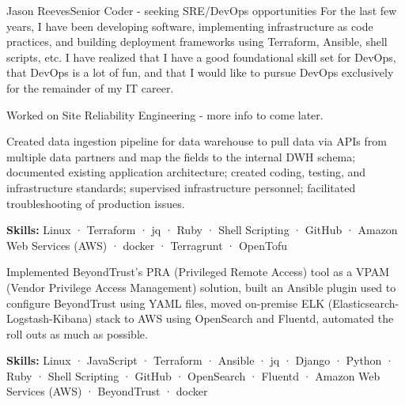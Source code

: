 \documentclass{article}
\begin{document}
\begin{cv}[avatar]{Jason Reeves}{Senior Coder - seeking SRE/DevOps opportunities}
For the last few years, I have been developing software, implementing infrastructure as code practices, and building deployment frameworks using Terraform, Ansible, shell scripts, etc.  I have realized that I have a good foundational skill set for DevOps, that DevOps is a lot of fun, and that I would like to pursue DevOps exclusively for the remainder of my IT career.

\begin{cvevent}[June 2024][present]
    Worked on Site Reliability Engineering - more info to come later.
    \vspace*{5mm}
\end{cvevent}

\begin{cvevent}[December 2023][June 2024]
    Created data ingestion pipeline for data warehouse to pull data via APIs from multiple data partners and map the fields to the internal DWH schema; documented existing application architecture; created coding, testing, and infrastructure standards; supervised infrastructure personnel; facilitated troubleshooting of production issues.

    \vspace*{3mm}
    \textbf{Skills:}  Linux · Terraform · jq · Ruby · Shell Scripting · GitHub · Amazon Web Services (AWS) · docker · Terragrunt · OpenTofu
    
    \vspace*{5mm}
\end{cvevent}

\begin{cvevent}[August 2021][December 2023]
    Implemented BeyondTrust's PRA (Privileged Remote Access) tool as a VPAM (Vendor Privilege Access Management) solution, built an Ansible plugin used to configure BeyondTrust using YAML files, moved on-premise ELK (Elasticsearch-Logstash-Kibana) stack to AWS using OpenSearch and Fluentd, automated the roll outs as much as possible.

    \vspace*{3mm}
    \textbf{Skills:}  Linux · JavaScript · Terraform · Ansible · jq · Django · Python · Ruby · Shell Scripting · GitHub · OpenSearch · Fluentd · Amazon Web Services (AWS) · BeyondTrust · docker


\end{cvevent}
\end{cv}
\end{document}
